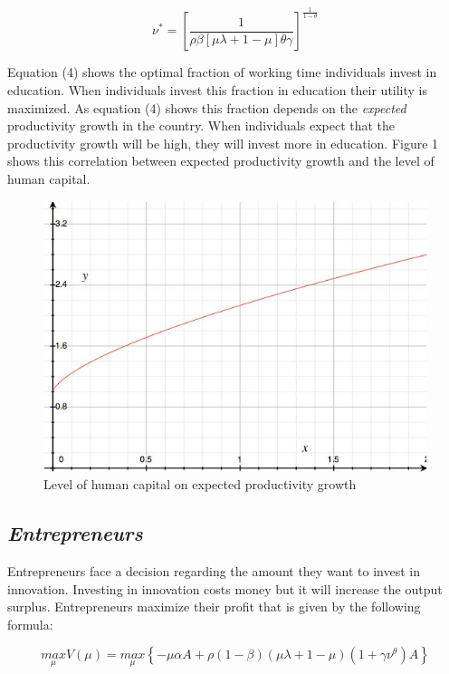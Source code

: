 \documentclass[a4paper,11pt]{article} %
\begin{document}
\begin{equation}
  \nu^{*}=\left[
    \frac{1}{\rho\beta
      \left[\mu\lambda+1-\mu\right]
    \theta\gamma}
  \right]^{\frac{1}{1-\theta}}
\end{equation}

Equation (4) shows the optimal fraction of working time individuals invest in education. When individuals invest this fraction in education their utility is maximized. As equation (4) shows this fraction depends on the \textit{expected} productivity growth in the country. When individuals expect that the productivity growth will be high, they will invest more in education. Figure 1 shows this correlation between expected productivity growth and the level of human capital.

\begin{figure}
  \centering
  \includegraphics{figure1.png}
  \caption{Level of human capital on expected productivity growth}
\end{figure}

\subsection*{\textit{Entrepreneurs}}
Entrepreneurs face a decision regarding the amount they want to invest in innovation. Investing in innovation costs money but it will increase the output surplus. Entrepreneurs maximize their profit that is given by the following formula:

\begin{equation}
\underset{\mu}{max}V(\mu)=
\underset{\mu}{max}
  \left\{-\mu\alpha A+\rho\left(1-\beta\right)\left(\mu\lambda+1-\mu\right)\left(1+\gamma\nu^{\theta}\right)A\right\}
\end{equation}
\end{document}
